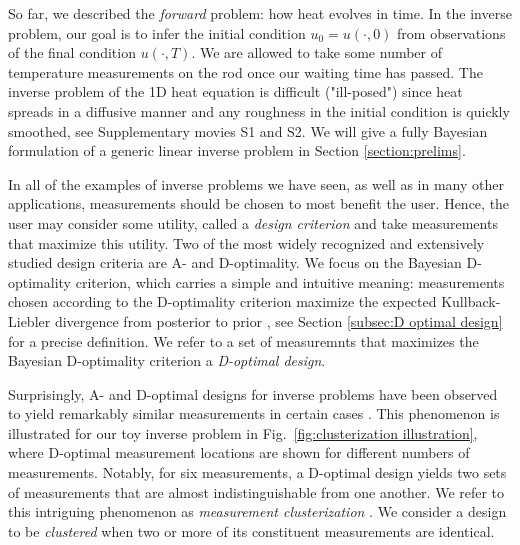 So far, we described the \emph{forward} problem: how heat evolves in
time. In the inverse problem, our goal is to infer the initial
condition $u_0 = u(\cdot, 0)$ from observations of the final condition
$u(\cdot, T)$. We are allowed to take some number of temperature
measurements on the rod once our waiting time has passed. The inverse
problem of the 1D heat equation is difficult ("ill-posed") since heat
spreads in a diffusive manner and any roughness in the initial
condition is quickly smoothed, see Supplementary movies S1 and S2. We
will give a fully Bayesian formulation of a generic linear inverse
problem in Section \ref{section:prelims}.

In all of the examples of inverse problems we have seen, as well as in
many other applications, measurements should be chosen to most benefit
the user. Hence, the user may consider some utility, called a
\emph{design criterion} and take measurements that maximize this
utility. Two of the most widely recognized and extensively studied
design criteria are A- and D-optimality. We focus on the Bayesian
D-optimality criterion, which carries a simple and intuitive meaning:
measurements chosen according to the D-optimality criterion maximize
the expected Kullback-Liebler divergence from posterior to prior
\cite{Chaloner1995, AlexanderianGloorGhattas14}, see Section
\ref{subsec:D optimal design} for a precise definition. We refer to a
set of measuremnts that maximizes the Bayesian D-optimality criterion
a \emph{D-optimal design}.


Surprisingly, A- and D-optimal designs for inverse problems have been
observed to yield remarkably similar measurements in certain cases
\cite{fedorov1996, nyberg2012, fedorov1997, Ucinski05,
  neitzel2019sparse}. This phenomenon is illustrated for our toy
inverse problem in Fig.~\ref{fig:clusterization illustration}, where
D-optimal measurement locations are shown for different numbers of
measurements. Notably, for six measurements, a D-optimal design yields
two sets of measurements that are almost indistinguishable from one
another. We refer to this intriguing phenomenon as \emph{measurement
clusterization} \cite{Ucinski05}. We consider a design to be
\emph{clustered} when two or more of its constituent measurements are
identical.

